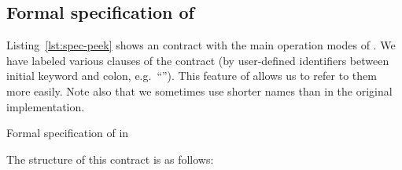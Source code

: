 \subsection{Formal specification of \peek}
\label{sec:formal-specification-peek}

Listing~\ref{lst:spec-peek} shows an \acsl contract with the 
main operation modes of \peek.
We have labeled various clauses of the contract (by user-defined
identifiers between initial keyword and colon, e.g.\
``'').
This feature of \acsl allows us to refer to them more easily.
Note also that we sometimes use shorter names than in the original implementation.

\begin{listing}[hbt]
\begin{minipage}{\textwidth}

\end{minipage}
\caption{\label{lst:spec-peek} Formal specification of \peek in \acsl}
\end{listing}

The structure of this contract is as follows:

